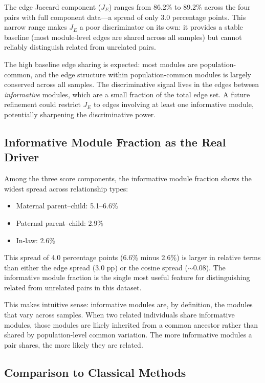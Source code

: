 \documentclass{../yalumba}
\begin{document}
The edge Jaccard component ($J_E$) ranges from 86.2\% to 89.2\% across the
four pairs with full component data---a spread of only 3.0 percentage points.
This narrow range makes $J_E$ a poor discriminator on its own: it provides a
stable baseline (most module-level edges are shared across all samples) but
cannot reliably distinguish related from unrelated pairs.

The high baseline edge sharing is expected: most modules are population-common,
and the edge structure within population-common modules is largely conserved
across all samples.  The discriminative signal lives in the edges between
\emph{informative} modules, which are a small fraction of the total edge set.
A future refinement could restrict $J_E$ to edges involving at least one
informative module, potentially sharpening the discriminative power.

\subsection{Informative Module Fraction as the Real Driver}

Among the three score components, the informative module fraction shows the
widest spread across relationship types:

\begin{itemize}
  \item Maternal parent--child: 5.1--6.6\%
  \item Paternal parent--child: 2.9\%
  \item In-law: 2.6\%
\end{itemize}

This spread of 4.0 percentage points (6.6\% minus 2.6\%) is larger in
relative terms than either the edge spread (3.0 pp) or the cosine spread
($\sim$0.08).  The informative module fraction is the single most useful
feature for distinguishing related from unrelated pairs in this dataset.

This makes intuitive sense: informative modules are, by definition, the modules
that vary across samples.  When two related individuals share informative
modules, those modules are likely inherited from a common ancestor rather than
shared by population-level common variation.  The more informative modules a
pair shares, the more likely they are related.

\subsection{Comparison to Classical Methods}
\end{document}
